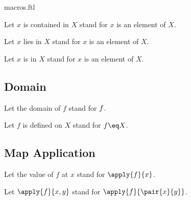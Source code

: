 \documentclass{article}
\begin{document}
\begin{smodule}{macros.ftl}
\begin{forthel}
  Let $x$ is contained in $X$ stand for $x$ is an element of $X$.

  Let $x$ lies in $X$ stand for $x$ is an element of $X$.

  Let $x$ is in $X$ stand for $x$ is an element of $X$.
\end{forthel}

\subsection{Domain}

\begin{forthel}
  Let the domain of $f$ stand for $\relax{f}$.

  Let $f$ is defined on $X$ stand for $\dom{f}\eq X$.
\end{forthel}

\subsection{Map Application}

\begin{forthel}
  Let the value of $f$ at $x$ stand for $\apply{f}{x}$.

  Let $\apply{f}{x,y}$ stand for $\apply{f}{\pair{x}{y}}$.
\end{forthel}
\end{smodule}
\end{document}

